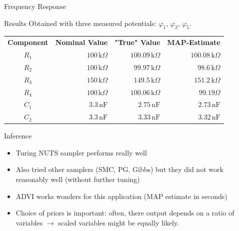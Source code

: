 \documentclass{beamer}
\begin{document}
  \begin{frame}{Frequency Response}
    
  \end{frame}

  \begin{frame}
    \begin{center}
      
    \end{center}
  \end{frame}

  \begin{frame}
    \begin{center}
      
    \end{center}
  \end{frame}

  \begin{frame}{Results}
    Obtained with three measured potentials: $\varphi_1$, $\varphi_2$, $\varphi_5$.

    \begin{tabular}{crrr}
      \textbf{Component}  & \textbf{Nominal Value} & \textbf{"True" Value} &\textbf{MAP-Estimate} \\
      $R_1$          & $100\,\text{k}\Omega$ & $100.09\,\text{k}\Omega$ & $100.08\,\text{k}\Omega$\\
      $R_2$          & $100\,\text{k}\Omega$ & $99.97\,\text{k}\Omega$  & $98.6\,\text{k}\Omega$\\
      $R_3$          & $150\,\text{k}\Omega$ & $149.5\,\text{k}\Omega$  & $151.2\,\text{k}\Omega$           \\
      $R_4$          & $100\,\text{k}\Omega$ & $100.06\,\text{k}\Omega$ & $99.19\Omega$           \\
      $C_1$          & $3.3\,\text{nF}$      & $2.75\,\text{nF}$        & $2.73\,\text{nF}$           \\
      $C_2$          & $3.3\,\text{nF}$      & $3.33\,\text{nF}$        & $3.32\,\text{nF}$           \\
    \end{tabular}
  \end{frame}


  \begin{frame}{Inference}
    \begin{itemize}
      \item Turing NUTS sampler performs really well
      \item Also tried other samplers (SMC, PG, Gibbs) but they did not work reasonably well (without further tuning) 
      \item ADVI works wonders for this application (MAP estimate in seconds)
      \item Choice of priors is important: often, there output depends on a ratio of variables $\rightarrow$ scaled variables might be equally likely.
    \end{itemize}
  \end{frame}
\end{document}
